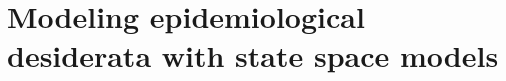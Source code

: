 
\section{Modeling epidemiological desiderata with state space models}
\label{sec:modelling_epidemiological_dessiderata_with_state_space_models}